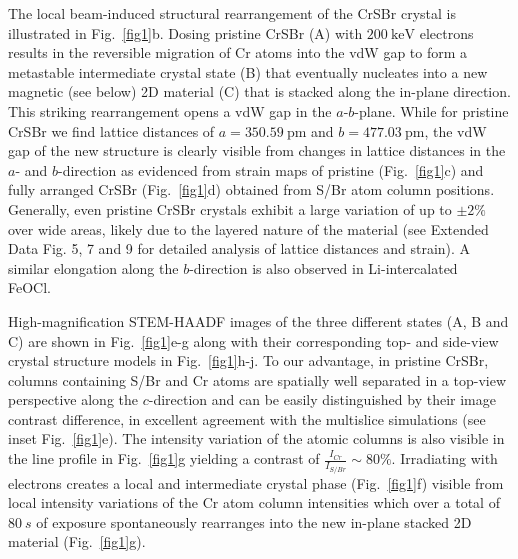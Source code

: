 \documentclass[aps,prl,showpacs,twocolumn,superscriptaddress,floatfix]{revtex4-2}
\begin{document}
The local beam-induced structural rearrangement of the CrSBr crystal is illustrated in Fig.~\ref{fig1}b. Dosing pristine CrSBr (A) with $\SI{200}{\kilo\electronvolt}$ electrons results in the reversible migration of Cr atoms into the vdW gap to form a metastable intermediate crystal state (B) that eventually nucleates into a new magnetic (see below) 2D material (C) that is stacked along the in-plane direction. This striking rearrangement opens a vdW gap in the $a$-$b$-plane. While for pristine CrSBr we find lattice distances of $a = \SI{350.59}{\pico\meter}$ and $b = \SI{477.03}{\pico\meter}$, the vdW gap of the new structure is clearly visible from changes in lattice distances in the $a$- and $b$-direction as evidenced from strain maps of pristine (Fig.~\ref{fig1}c) and fully arranged CrSBr (Fig.~\ref{fig1}d) obtained from S/Br atom column positions. Generally, even pristine CrSBr crystals exhibit a large variation of up to $\pm 2\%$ over wide areas, likely due to the layered nature of the material (see Extended Data Fig. 5, 7 and 9 for detailed analysis of lattice distances and strain). A similar elongation along the $b$-direction is also observed in Li-intercalated FeOCl.~\cite{Palvadeau.1978,Beck.1990}

High-magnification STEM-HAADF images of the three different states (A, B and C) are shown in Fig.~\ref{fig1}e-g along with their corresponding top- and side-view crystal structure models in Fig.~\ref{fig1}h-j. To our advantage, in pristine CrSBr, columns containing S/Br and Cr atoms are spatially well separated in a top-view perspective along the $c$-direction and can be easily distinguished by their image contrast difference, in excellent agreement with the multislice simulations (see inset Fig.~\ref{fig1}e). The intensity variation of the atomic columns is also visible in the line profile in Fig.~\ref{fig1}g yielding a contrast of $\frac{I_{Cr}}{I_{S/Br}} \sim 80\%$. Irradiating with electrons creates a local and intermediate crystal phase (Fig.~\ref{fig1}f) visible from local intensity variations of the Cr atom column intensities which over a total of $\SI{80}{s}$ of exposure spontaneously rearranges into the new in-plane stacked 2D material (Fig.~\ref{fig1}g). 
\end{document}
